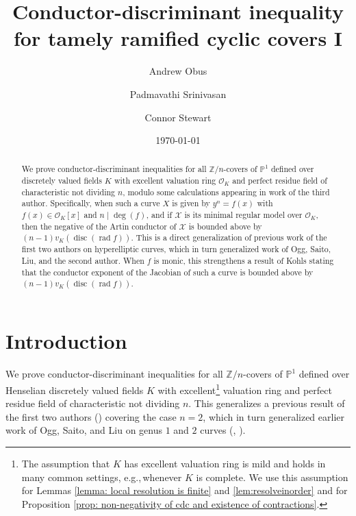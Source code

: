 \documentclass[12pt]{amsart}
\title[Conductor-discriminant inequality]{Conductor-discriminant
  inequality for tamely ramified cyclic covers I}
\author{Andrew Obus}
\author{Padmavathi Srinivasan}
\author{Connor Stewart}
\date{\today}
\numberwithin{equation}{section}
\theoremstyle{definition}
\newcommand{\mc}[1]{\mathcal{#1}}
\newcommand{\ints}{\mathbb Z}
\newcommand{\proj}{\mathbb P}
\DeclareMathOperator{\disc}{disc}
\DeclareMathOperator{\rad}{rad}
\begin{document}
\maketitle

\begin{abstract}
We prove conductor-discriminant inequalities for all $\ints/n$-covers of $\proj^1$ defined over discretely valued
fields $K$ with excellent valuation ring $\mc{O}_K$ and perfect residue field of characteristic not dividing
$n$, modulo some calculations appearing in work \cite{Part2} of
the third author. Specifically,
when such a curve $X$ is given by $y^n = f(x)$ with $f(x) \in \mc{O}_K[x]$
and $n\mid\deg(f)$, and if $\mc{X}$ is its minimal regular model over
$\mc{O}_K$, then the negative of the Artin conductor of $\mc{X}$ is bounded
above by $(n-1)v_K(\disc(\rad f))$.  This is a direct generalization of
previous work of the first two authors on hyperelliptic curves,
which in turn generalized work of Ogg, Saito, Liu, and the second author. When $f$ is monic, this strengthens a result of Kohls stating that the conductor exponent of the Jacobian of such a curve is bounded above by $(n-1)v_K(\disc(\rad f))$.
\end{abstract}


\section{Introduction}
We prove conductor-discriminant inequalities for all $\ints/n$-covers
of $\proj^1$ defined over Henselian discretely valued
fields $K$ with excellent\footnote{The assumption that $K$ has excellent valuation ring is mild and holds in many common settings, e.g.,\,whenever $K$ is complete. We use this assumption for Lemmas \ref{lemma: local resolution is finite} and \ref{lem:resolveinorder} and for Proposition \ref{prop: non-negativity of cdc and existence of contractions}.} valuation ring and perfect residue field of characteristic not dividing
$n$. This generalizes a previous result of the first two authors
(\cite{OShyper_published}) covering the case $n = 2$, which in turn
generalized earlier work of Ogg, Saito, and Liu on genus $1$ and $2$
curves (\cite{saito2}, \cite{Li:cd}).
\end{document}
